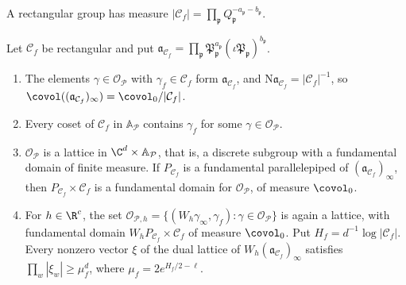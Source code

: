 A rectangular group has measure
$|\mathcal C_f|=\prod_{\mathfrak p}Q_{\mathfrak p}^{-a_{\mathfrak
p}-b_{\mathfrak p}}$.

\begin{lemma}\label{fw:lattice}
Let $\mathcal C_f$ be rectangular and put
$\mathfrak a_{\mathcal C_f}=\prod_{\mathfrak p}\mathfrak P_{\mathfrak p}^{a_{\mathfrak
p}}(\iota\mathfrak P_{\mathfrak p})^{b_{\mathfrak p}}$.
\begin{enumerate}
\item[(a)] The elements $\gamma\in\mathcal O_{\mathcal P}$ with $\gamma_f\in\mathcal C_f$
form $\mathfrak a_{\mathcal C_f}$, and $\mathrm N\mathfrak a_{\mathcal C_f}=|\mathcal C_f|^{-1}$, so
$\covol((\mathfrak a_{\mathcal C_f})_\infty)=\covol_0/|\mathcal C_f|$.
\item[(b)] Every coset of $\mathcal C_f$ in $\mathbb A_{\mathcal P}$
contains $\gamma_f$ for some $\gamma\in\mathcal O_{\mathcal P}$.
\item[(c)] $\mathcal O_{\mathcal P}$ is a lattice in $\C^d\times\mathbb A_{\mathcal P}$,
that is, a discrete subgroup with a fundamental domain of finite
measure. If $P_{\mathcal C_f}$ is a fundamental parallelepiped of
$(\mathfrak a_{\mathcal C_f})_\infty$, then $P_{\mathcal C_f}\times\mathcal C_f$ is a
fundamental domain for $\mathcal O_{\mathcal P}$, of measure $\covol_0$.
\item[(d)] For $h\in\R^c$, the set
$\mathcal O_{\mathcal P,h}=\{(W_h\gamma_\infty,\gamma_f):\gamma\in\mathcal
O_{\mathcal P}\}$ is again a lattice, with fundamental domain $W_hP_{\mathcal C_f}\times\mathcal C_f$
of measure $\covol_0$. Put $H_f=d^{-1}\log|\mathcal C_f|$. Every nonzero
vector $\xi$ of the dual lattice of $W_h(\mathfrak a_{\mathcal C_f})_\infty$ satisfies
$\prod_w|\xi_w|\ge\mu_f^d$, where $\mu_f=2e^{H_f/2-\ell}$.
\end{enumerate}
\end{lemma}

